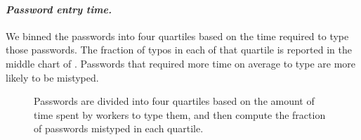 \paragraph{\em Password entry time.} We binned the passwords into four quartiles based on the time required
to type those passwords. The fraction of typos in each of that quartile
is reported in the middle chart of . 
Passwords that required more time on average to type are more likely to be
mistyped. 
\begin{figure}[t]
  \centering 

    \caption{ 
    Passwords are divided into four quartiles based
    on the amount of time spent by workers to type them, and then compute
    the fraction of passwords mistyped in each quartile. }
  \label{fig:typetime-typo} 
\end{figure}

